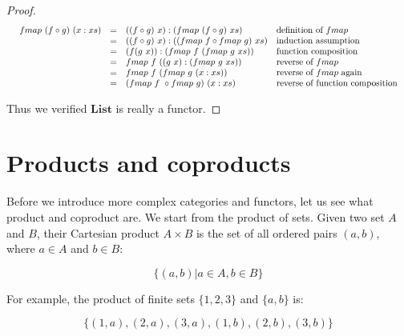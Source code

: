 \documentclass{article}
\begin{document}
\begin{example}
\begin{mdframed}
\begin{proof}
\[
\resizebox{\textwidth}{!}{\ensuremath{
\begin{array}{rcll}
fmap\ (f \circ g)\ (x:xs) & = & ((f \circ g)\ x):(fmap\ (f \circ g)\ xs) & \text{definition of $fmap$} \\
  & = & ((f \circ g)\ x):((fmap\ f \circ fmap\ g)\ xs) & \text{induction assumption} \\
  & = & (f(g\ x)):(fmap\ f\ (fmap\ g\ xs)) & \text{function composition} \\
  & = & fmap\ f\ ((g\ x):(fmap\ g\ xs)) & \text{reverse of $fmap$} \\
  & = & fmap\ f\ (fmap\ g\ (x:xs)) & \text{reverse of $fmap$ again} \\
  & = & (fmap\ f\ \circ fmap\ g)\ (x:xs) & \text{reverse of function composition}
\end{array}
}}
\]

Thus we verified $\mathbf{List}$ is really a functor.
\end{proof}
\end{mdframed}
\end{example}

\begin{Exercise}
\end{Exercise}

\section{Products and coproducts}

Before we introduce more complex categories and functors, let us see what product and coproduct are. We start from the product of sets. Given two set $A$ and $B$, their Cartesian product $A \times B$ is the set of all ordered pairs $(a, b)$, where $a \in A$ and $b \in B$:

\[
\{(a, b) | a \in A, b \in B\}
\]

For example, the product of finite sets $\{1, 2, 3\}$ and $\{a, b\}$ is:

\[
\{(1, a), (2, a), (3, a), (1, b), (2, b), (3, b)\}
\]
\end{document}
